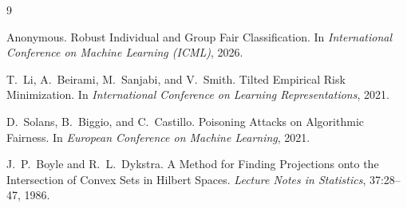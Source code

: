 \documentclass[11pt,a4paper]{article}
\begin{document}

\begin{thebibliography}{9}

Anonymous.
\newblock Robust Individual and Group Fair Classification.
\newblock In \emph{International Conference on Machine Learning (ICML)}, 2026.

T.~Li, A.~Beirami, M.~Sanjabi, and V.~Smith.
\newblock Tilted Empirical Risk Minimization.
\newblock In \emph{International Conference on Learning Representations}, 2021.

D.~Solans, B.~Biggio, and C.~Castillo.
\newblock Poisoning Attacks on Algorithmic Fairness.
\newblock In \emph{European Conference on Machine Learning}, 2021.

J.~P.~Boyle and R.~L.~Dykstra.
\newblock A Method for Finding Projections onto the Intersection of Convex Sets
  in Hilbert Spaces.
\newblock \emph{Lecture Notes in Statistics}, 37:28--47, 1986.

\end{thebibliography}
\end{document}
